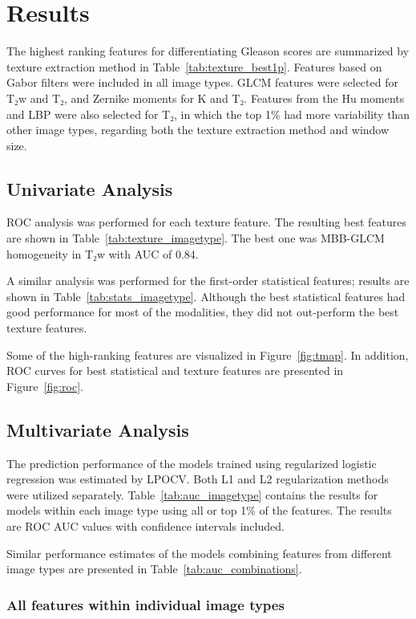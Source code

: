 \section{Results}

The highest ranking features for differentiating Gleason scores are summarized
by texture extraction method in Table~\ref{tab:texture_best1p}. Features based
on Gabor filters were included in all image types. GLCM features were selected
for T₂w and T₂, and Zernike moments for K and T₂. Features from the Hu
moments and LBP were also selected for T₂, in which the top 1\% had more
variability than other image types, regarding both the texture extraction method
and window size.


\subsection{Univariate Analysis}

ROC analysis was performed for each texture feature. The resulting best features
are shown in Table~\ref{tab:texture_imagetype}. The best one was MBB-GLCM
homogeneity in T₂w with AUC of 0.84.

A similar analysis was performed for the first-order statistical features;
results are shown in Table~\ref{tab:stats_imagetype}. Although the best
statistical features had good performance for most of the modalities, they did
not out-perform the best texture features.

Some of the high-ranking features are visualized in Figure~\ref{fig:tmap}. In
addition, ROC curves for best statistical and texture features are presented in
Figure~\ref{fig:roc}.


\subsection{Multivariate Analysis}

The prediction performance of the models trained using regularized logistic
regression was estimated by LPOCV\@. Both L1 and L2 regularization methods were
utilized separately. Table~\ref{tab:auc_imagetype} contains the results for
models within each image type using all or top 1\% of the features. The results
are ROC AUC values with confidence intervals included.

Similar performance estimates of the models combining features from different
image types are presented in Table~\ref{tab:auc_combinations}.


\subsubsection{All features within individual image types}

